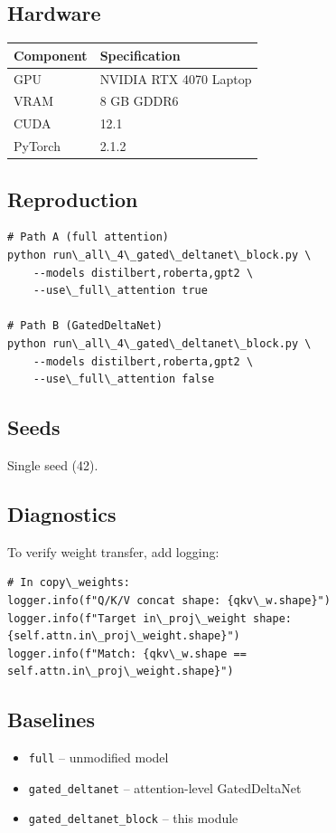 \subsection{Hardware}

\begin{table}[H]
\centering
\small
\begin{tabular}{ll}
\toprule
\textbf{Component} & \textbf{Specification} \\
\midrule
GPU & NVIDIA RTX 4070 Laptop \\
VRAM & 8 GB GDDR6 \\
CUDA & 12.1 \\
PyTorch & 2.1.2 \\
\bottomrule
\end{tabular}
\end{table}

\subsection{Reproduction}

\begin{lstlisting}
# Path A (full attention)
python run\_all\_4\_gated\_deltanet\_block.py \
    --models distilbert,roberta,gpt2 \
    --use\_full\_attention true

# Path B (GatedDeltaNet)
python run\_all\_4\_gated\_deltanet\_block.py \
    --models distilbert,roberta,gpt2 \
    --use\_full\_attention false
\end{lstlisting}

\subsection{Seeds}

Single seed (42).

\subsection{Diagnostics}

To verify weight transfer, add logging:

\begin{lstlisting}
# In copy\_weights:
logger.info(f"Q/K/V concat shape: {qkv\_w.shape}")
logger.info(f"Target in\_proj\_weight shape: {self.attn.in\_proj\_weight.shape}")
logger.info(f"Match: {qkv\_w.shape == self.attn.in\_proj\_weight.shape}")
\end{lstlisting}

\subsection{Baselines}

\begin{itemize}
\item \texttt{full} -- unmodified model
\item \texttt{gated\_deltanet} -- attention-level GatedDeltaNet
\item \texttt{gated\_deltanet\_block} -- this module

\end{itemize}

